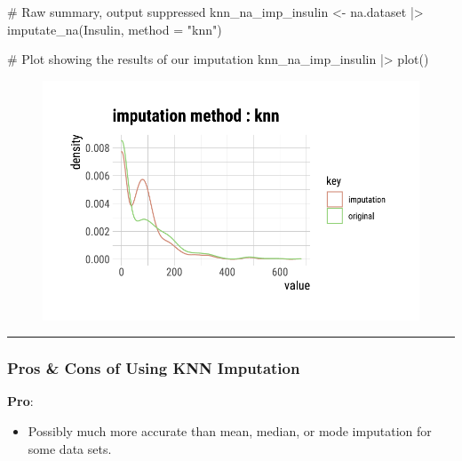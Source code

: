 \documentclass[
  letterpaper,
  DIV=11,
  numbers=noendperiod]{scrreprt}
\newenvironment{Shaded}{\begin{snugshade}}{\end{snugshade}}
\newcommand{\AttributeTok}[1]{\textcolor[rgb]{0.40,0.45,0.13}{#1}}
\newcommand{\CommentTok}[1]{\textcolor[rgb]{0.37,0.37,0.37}{#1}}
\newcommand{\FunctionTok}[1]{\textcolor[rgb]{0.28,0.35,0.67}{#1}}
\newcommand{\NormalTok}[1]{\textcolor[rgb]{0.00,0.23,0.31}{#1}}
\newcommand{\OtherTok}[1]{\textcolor[rgb]{0.00,0.23,0.31}{#1}}
\newcommand{\SpecialCharTok}[1]{\textcolor[rgb]{0.37,0.37,0.37}{#1}}
\newcommand{\StringTok}[1]{\textcolor[rgb]{0.13,0.47,0.30}{#1}}
\providecommand{\tightlist}{%
  \setlength{\itemsep}{0pt}\setlength{\parskip}{0pt}}\usepackage{longtable,booktabs,array}
\begin{document}
\begin{Shaded}
\begin{Highlighting}[]
\CommentTok{\# Raw summary, output suppressed}
\NormalTok{knn\_na\_imp\_insulin }\OtherTok{\textless{}{-}}\NormalTok{ na.dataset }\SpecialCharTok{|\textgreater{}}
  \FunctionTok{imputate\_na}\NormalTok{(Insulin, }\AttributeTok{method =} \StringTok{"knn"}\NormalTok{)}

\CommentTok{\# Plot showing the results of our imputation}
\NormalTok{knn\_na\_imp\_insulin }\SpecialCharTok{|\textgreater{}}
  \FunctionTok{plot}\NormalTok{()}
\end{Highlighting}
\end{Shaded}

\begin{figure}[H]

{\centering \includegraphics{./ImputatingLikeDataScientist_files/figure-pdf/unnamed-chunk-20-1.pdf}

}

\end{figure}

\begin{center}\rule{0.5\linewidth}{0.5pt}\end{center}

\hypertarget{pros-cons-of-using-knn-imputation}{%
\subsubsection{Pros \& Cons of Using KNN
Imputation}\label{pros-cons-of-using-knn-imputation}}

\textbf{Pro}:

\begin{itemize}
\tightlist
\item
  Possibly much more accurate than mean, median, or mode imputation for
  some data sets.
\end{itemize}
\end{document}
